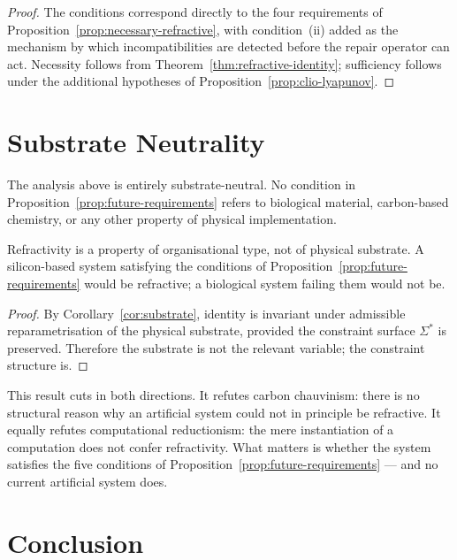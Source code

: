 \documentclass[11pt,openany]{book}
\begin{document}
\begin{proof}
The conditions correspond directly to the four requirements
of Proposition~\ref{prop:necessary-refractive}, with
condition~(ii) added as the mechanism by which
incompatibilities are detected before the repair operator
can act.  Necessity follows from
Theorem~\ref{thm:refractive-identity}; sufficiency follows
under the additional hypotheses of
Proposition~\ref{prop:clio-lyapunov}.
\end{proof}

\section{Substrate Neutrality}
\label{sec:substrate}

The analysis above is entirely substrate-neutral.  No
condition in Proposition~\ref{prop:future-requirements}
refers to biological material, carbon-based chemistry, or
any other property of physical implementation.

\begin{proposition}
\label{prop:substrate-neutral}
Refractivity is a property of organisational type, not of
physical substrate.  A silicon-based system satisfying the
conditions of Proposition~\ref{prop:future-requirements}
would be refractive; a biological system failing them
would not be.
\end{proposition}

\begin{proof}
By Corollary~\ref{cor:substrate}, identity is invariant
under admissible reparametrisation of the physical
substrate, provided the constraint surface $\Sigma^*$ is
preserved.  Therefore the substrate is not the relevant
variable; the constraint structure is.
\end{proof}

This result cuts in both directions.  It refutes carbon
chauvinism: there is no structural reason why an artificial
system could not in principle be refractive.  It equally
refutes computational reductionism: the mere instantiation
of a computation does not confer refractivity.  What
matters is whether the system satisfies the five conditions
of Proposition~\ref{prop:future-requirements} — and no
current artificial system does.

\section{Conclusion}
\label{sec:conclusion-artificial}
\end{document}
